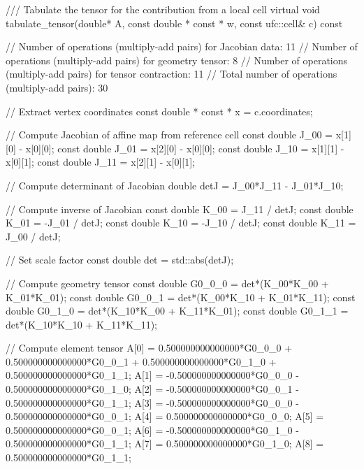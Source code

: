 {\scriptsize
\begin{code}
/// Tabulate the tensor for the contribution from a local cell
virtual void tabulate_tensor(double* A,
                             const double * const * w,
                             const ufc::cell& c) const
{
  // Number of operations (multiply-add pairs) for Jacobian data:      11
  // Number of operations (multiply-add pairs) for geometry tensor:    8
  // Number of operations (multiply-add pairs) for tensor contraction: 11
  // Total number of operations (multiply-add pairs):                  30

  // Extract vertex coordinates
  const double * const * x = c.coordinates;

  // Compute Jacobian of affine map from reference cell
  const double J_00 = x[1][0] - x[0][0];
  const double J_01 = x[2][0] - x[0][0];
  const double J_10 = x[1][1] - x[0][1];
  const double J_11 = x[2][1] - x[0][1];

  // Compute determinant of Jacobian
  double detJ = J_00*J_11 - J_01*J_10;

  // Compute inverse of Jacobian
  const double K_00 =  J_11 / detJ;
  const double K_01 = -J_01 / detJ;
  const double K_10 = -J_10 / detJ;
  const double K_11 =  J_00 / detJ;

  // Set scale factor
  const double det = std::abs(detJ);

  // Compute geometry tensor
  const double G0_0_0 = det*(K_00*K_00 + K_01*K_01);
  const double G0_0_1 = det*(K_00*K_10 + K_01*K_11);
  const double G0_1_0 = det*(K_10*K_00 + K_11*K_01);
  const double G0_1_1 = det*(K_10*K_10 + K_11*K_11);

  // Compute element tensor
  A[0] = 0.500000000000000*G0_0_0 + 0.500000000000000*G0_0_1
       + 0.500000000000000*G0_1_0 + 0.500000000000000*G0_1_1;
  A[1] = -0.500000000000000*G0_0_0 - 0.500000000000000*G0_1_0;
  A[2] = -0.500000000000000*G0_0_1 - 0.500000000000000*G0_1_1;
  A[3] = -0.500000000000000*G0_0_0 - 0.500000000000000*G0_0_1;
  A[4] = 0.500000000000000*G0_0_0;
  A[5] = 0.500000000000000*G0_0_1;
  A[6] = -0.500000000000000*G0_1_0 - 0.500000000000000*G0_1_1;
  A[7] = 0.500000000000000*G0_1_0;
  A[8] = 0.500000000000000*G0_1_1;
}
\end{code}
}

